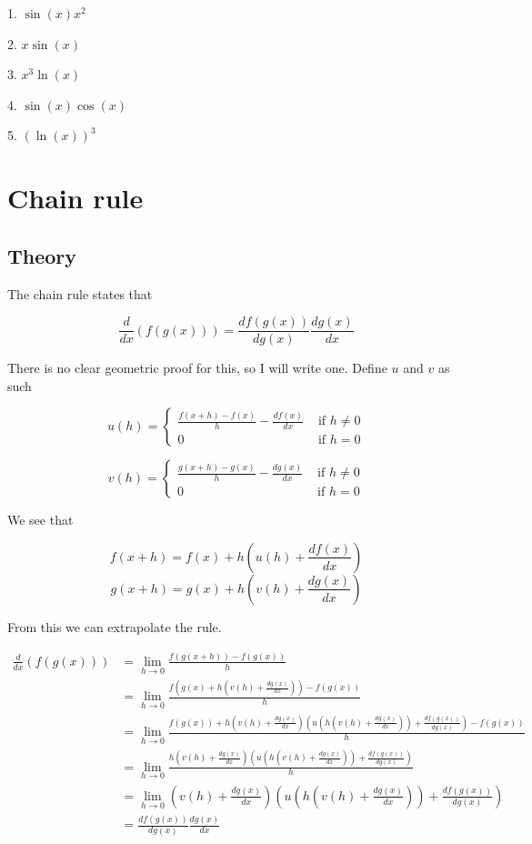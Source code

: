 \documentclass[a4paper,12pt,oneside]{book}
\begin{document}
1. $\sin(x)x^2$

2. $x\sin(x)$

3. $x^3\ln(x)$

4. $\sin(x)\cos(x)$

5. $(\ln(x))^3$

\section{Chain rule}

\subsection{Theory}

The chain rule states that

$$\frac{d}{dx}(f(g(x)))=\frac{df(g(x))}{dg(x)}\frac{dg(x)}{dx}$$

\noindent There is no clear geometric proof for this, so I will write one. Define $u$ and $v$ as such

$$u(h)=\left\{ {\begin{array}{*{20}{l}}{\displaystyle \frac{{f( {x + h}) - f( x)}}{h} - \frac{df(x)}{dx}}&{{\mbox{  if }}h \ne 0}\\0&{{\mbox{  if }}h = 0}\end{array}} \right.$$

$$v(h)=\left\{ {\begin{array}{*{20}{l}}{\displaystyle \frac{{g( {x + h}) - g( x)}}{h} - \frac{dg(x)}{dx}}&{{\mbox{  if }}h \ne 0}\\0&{{\mbox{  if }}h = 0}\end{array}} \right.$$

\noindent We see that

$$f(x+h)=f(x)+h\left(u(h)+\frac{df(x)}{dx}\right)$$
$$g(x+h)=g(x)+h\left(v(h)+\frac{dg(x)}{dx}\right)$$

\noindent From this we can extrapolate the rule.

$$\begin{aligned}
\frac{d}{dx}(f(g(x)))&=\lim_{h\to 0}\frac{f(g(x+h))-f(g(x))}{h}\\
&=\lim_{h\to 0}\frac{f(g(x)+h\left(v(h)+\frac{dg(x)}{dx}\right))-f(g(x))}{h}\\
&=\lim_{h\to 0}\frac{f(g(x))+h\left(v(h)+\frac{dg(x)}{dx}\right)\left(u(h\left(v(h)+\frac{dg(x)}{dx}\right))+\frac{df(g(x))}{dg(x)}\right)-f(g(x))}{h}\\
&=\lim_{h\to 0}\frac{h\left(v(h)+\frac{dg(x)}{dx}\right)\left(u(h\left(v(h)+\frac{dg(x)}{dx}\right))+\frac{df(g(x))}{dg(x)}\right)}{h}\\
&=\lim_{h\to 0}\left(v(h)+\frac{dg(x)}{dx}\right)\left(u(h\left(v(h)+\frac{dg(x)}{dx}\right))+\frac{df(g(x))}{dg(x)}\right)\\
&=\frac{df(g(x))}{dg(x)}\frac{dg(x)}{dx}
\end{aligned}$$
\end{document}
